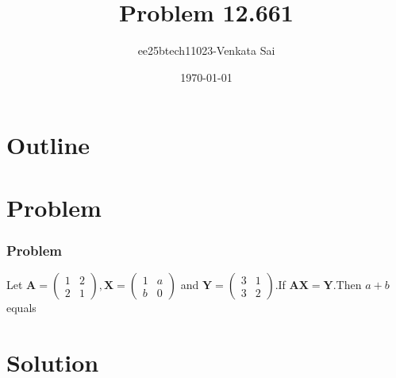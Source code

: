 \documentclass{beamer}
\title{Problem 12.661}
\author{ee25btech11023-Venkata Sai}
\date{\today}
\theoremstyle{remark}
\newcommand{\myvec}[1]{\ensuremath{\begin{pmatrix}#1\end{pmatrix}}}
\let\vec\mathbf
\numberwithin{equation}{section}
\begin{document}
\begin{frame}
\titlepage
\end{frame}

\section*{Outline}
\begin{frame}
\tableofcontents
\end{frame}

\section{Problem}

\begin{frame}
\frametitle{Problem}
Let $\vec{A}=\myvec{1&2\\2&1}, \vec{X}=\myvec{1&a\\b&0}$ and $\vec{Y}=\myvec{3&1\\3&2}$.If $\vec{AX=Y}$.Then $a+b$ equals
\end{frame}
\section{Solution}

 
\end{document}
